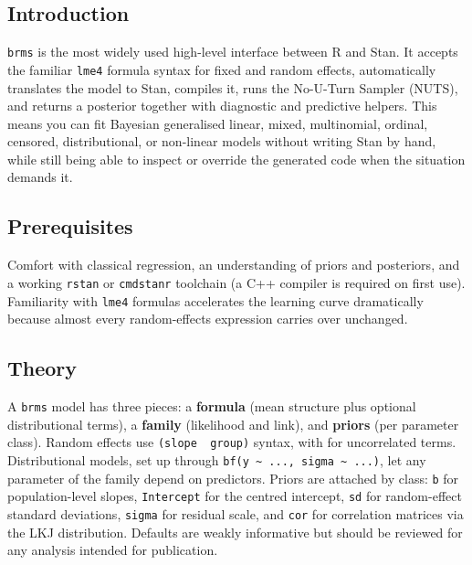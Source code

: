 \documentclass[
]{article}
\author{}
\date{\vspace{-2.5em}}
\begin{document}
\subsection{Introduction}\label{introduction}

\texttt{brms} is the most widely used high-level interface between R and
Stan. It accepts the familiar \texttt{lme4} formula syntax for fixed and
random effects, automatically translates the model to Stan, compiles it,
runs the No-U-Turn Sampler (NUTS), and returns a posterior together with
diagnostic and predictive helpers. This means you can fit Bayesian
generalised linear, mixed, multinomial, ordinal, censored,
distributional, or non-linear models without writing Stan by hand, while
still being able to inspect or override the generated code when the
situation demands it.

\subsection{Prerequisites}\label{prerequisites}

Comfort with classical regression, an understanding of priors and
posteriors, and a working \texttt{rstan} or \texttt{cmdstanr} toolchain
(a C++ compiler is required on first use). Familiarity with
\texttt{lme4} formulas accelerates the learning curve dramatically
because almost every random-effects expression carries over unchanged.

\subsection{Theory}\label{theory}

A \texttt{brms} model has three pieces: a \textbf{formula} (mean
structure plus optional distributional terms), a \textbf{family}
(likelihood and link), and \textbf{priors} (per parameter class). Random
effects use \texttt{(slope\ \textbar{}\ group)} syntax, with
\texttt{\textbar{}\textbar{}} for uncorrelated terms. Distributional
models, set up through
\texttt{bf(y\ \textasciitilde{}\ ...,\ sigma\ \textasciitilde{}\ ...)},
let any parameter of the family depend on predictors. Priors are
attached by class: \texttt{b} for population-level slopes,
\texttt{Intercept} for the centred intercept, \texttt{sd} for
random-effect standard deviations, \texttt{sigma} for residual scale,
and \texttt{cor} for correlation matrices via the LKJ distribution.
Defaults are weakly informative but should be reviewed for any analysis
intended for publication.
\end{document}
